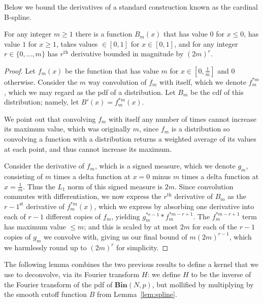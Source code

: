 \documentclass[11pt]{article}
\theoremstyle{plain}
\newcommand{\Bin}[2]{\textbf{Bin}(#1,#2)}
\begin{document}
Below we bound the derivatives of a standard construction known as the cardinal B-spline.

\begin{lemma}\label{lem:spline}
For any integer $m\geq 1$ there is a function $B_m(x)$ that has value $0$ for $x\leq 0$, has value $1$ for $x\geq 1$, takes values $\in[0,1]$ for $x\in[0,1]$, and for any integer $r\in \{0,\ldots,m\}$ has $r^{\textrm{th}}$ derivative bounded in magnitude by $(2m)^r$.
\end{lemma}
\begin{proof}
Let $f_m(x)$ be the function that has value $m$ for $x\in[0,\frac{1}{m}]$ and 0 otherwise. Consider the $m$ way convolution of $f_m$ with itself, which we denote $f_m^{*m}$, which we may regard as the pdf of a distribution. Let $B_m$ be the cdf of this distribution; namely, let $B'(x)=f_m^{*m}(x)$. 

We point out that convolving $f_m$ with itself any number of times cannot increase its maximum value, which was originally $m$, since $f_m$ is a distribution so convolving a function with a distribution returns a weighted average of its values at each point, and thus cannot increase its maximum.

Consider the derivative of $f_m$, which is a signed measure, which we denote $g_m$, consisting of $m$ times a delta function at $x=0$ minus $m$ times a delta function at $x=\frac{1}{m}$. Thus the $L_1$ norm of this signed measure is $2m$. Since convolution commutes with differentiation, we now express the $r^{\textrm{th}}$ derivative of $B_m$ as the $r-1^{\textrm{st}}$ derivative of $f_m^{*m}(x)$, which we express by absorbing one derivative into each of $r-1$ different copies of $f_m$, yielding $g_m^{*r-1}*f_m^{*m-r+1}$. The $f_m^{*m-r+1}$ term has maximum value $\leq m$; and this is scaled by at most $2m$ for each of the $r-1$ copies of $g_m$ we convolve with, giving us our final bound of $m(2m)^{r-1}$, which we harmlessly round up to $(2m)^r$ for simplicity.
\end{proof}


The following lemma combines the two previous results to define a kernel that we use to deconvolve, via its Fourier transform $H$: we define $H$ to be the inverse of the Fourier transform of the pdf of $\Bin{N}{p}$, but mollified by multiplying by the smooth cutoff function $B$ from Lemma~\ref{lem:spline}.
\end{document}
